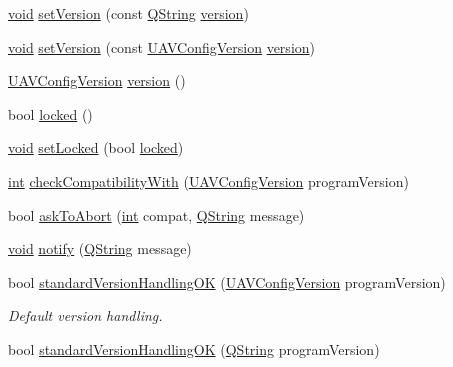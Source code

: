 \begin{DoxyCompactItemize}
\item 
\hyperlink{group___u_a_v_objects_plugin_ga444cf2ff3f0ecbe028adce838d373f5c}{void} \hyperlink{group___core_plugin_gabca8cfe88b7b3320fb60709744be4822}{set\-Version} (const \hyperlink{group___u_a_v_objects_plugin_gab9d252f49c333c94a72f97ce3105a32d}{Q\-String} \hyperlink{group___core_plugin_ga445d72afa775caf72f6d61884a36e7aa}{version})
\item 
\hyperlink{group___u_a_v_objects_plugin_ga444cf2ff3f0ecbe028adce838d373f5c}{void} \hyperlink{group___core_plugin_ga10f4af0da477f5dc204e90f098536f8e}{set\-Version} (const \hyperlink{class_core_1_1_u_a_v_config_version}{U\-A\-V\-Config\-Version} \hyperlink{group___core_plugin_ga445d72afa775caf72f6d61884a36e7aa}{version})
\item 
\hyperlink{class_core_1_1_u_a_v_config_version}{U\-A\-V\-Config\-Version} \hyperlink{group___core_plugin_ga445d72afa775caf72f6d61884a36e7aa}{version} ()
\item 
bool \hyperlink{group___core_plugin_gae8a23766a2405c85a6ac7515dc1e5e9d}{locked} ()
\item 
\hyperlink{group___u_a_v_objects_plugin_ga444cf2ff3f0ecbe028adce838d373f5c}{void} \hyperlink{group___core_plugin_gaf37f5f245b67fb9dcf0ae19779ec8a73}{set\-Locked} (bool \hyperlink{group___core_plugin_gae8a23766a2405c85a6ac7515dc1e5e9d}{locked})
\item 
\hyperlink{ioapi_8h_a787fa3cf048117ba7123753c1e74fcd6}{int} \hyperlink{group___core_plugin_gab48536a30f7d945c7016ab7494f601b5}{check\-Compatibility\-With} (\hyperlink{class_core_1_1_u_a_v_config_version}{U\-A\-V\-Config\-Version} program\-Version)
\item 
bool \hyperlink{group___core_plugin_ga1648c527c920c77b7ba0c74881b5879a}{ask\-To\-Abort} (\hyperlink{ioapi_8h_a787fa3cf048117ba7123753c1e74fcd6}{int} compat, \hyperlink{group___u_a_v_objects_plugin_gab9d252f49c333c94a72f97ce3105a32d}{Q\-String} message)
\item 
\hyperlink{group___u_a_v_objects_plugin_ga444cf2ff3f0ecbe028adce838d373f5c}{void} \hyperlink{group___core_plugin_ga63c43e21f82a123395715f520bdb27ad}{notify} (\hyperlink{group___u_a_v_objects_plugin_gab9d252f49c333c94a72f97ce3105a32d}{Q\-String} message)
\item 
bool \hyperlink{group___core_plugin_ga930044c2182f030e9e7dbae1ced5d69e}{standard\-Version\-Handling\-O\-K} (\hyperlink{class_core_1_1_u_a_v_config_version}{U\-A\-V\-Config\-Version} program\-Version)
\begin{DoxyCompactList}\small\item\em Default version handling. \end{DoxyCompactList}\item 
bool \hyperlink{group___core_plugin_ga0a9befeee7c88114d44c760860926608}{standard\-Version\-Handling\-O\-K} (\hyperlink{group___u_a_v_objects_plugin_gab9d252f49c333c94a72f97ce3105a32d}{Q\-String} program\-Version)
\end{DoxyCompactItemize}


